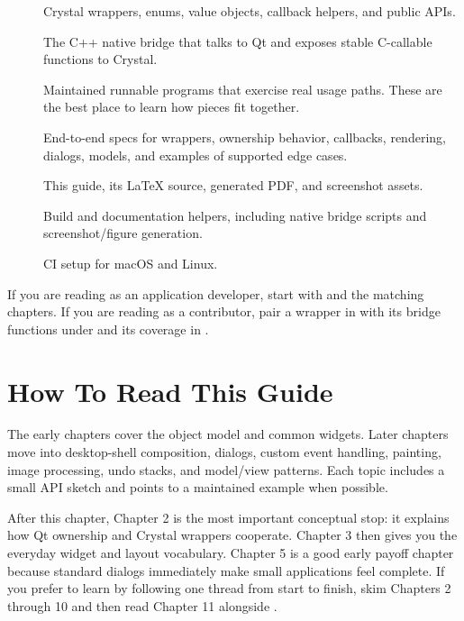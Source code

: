\begin{description}
\item[] Crystal wrappers, enums, value objects, callback helpers, and public APIs.
\item[] The C++ native bridge that talks to Qt and exposes stable C-callable functions to Crystal.
\item[] Maintained runnable programs that exercise real usage paths. These are the best place to learn how pieces fit together.
\item[] End-to-end specs for wrappers, ownership behavior, callbacks, rendering, dialogs, models, and examples of supported edge cases.
\item[] This guide, its LaTeX source, generated PDF, and screenshot assets.
\item[] Build and documentation helpers, including native bridge scripts and screenshot/figure generation.
\item[] CI setup for macOS and Linux.
\end{description}

If you are reading as an application developer, start with  and the matching chapters. If you are reading as a contributor, pair a wrapper in  with its bridge functions under  and its coverage in .

\section{How To Read This Guide}

The early chapters cover the object model and common widgets. Later chapters move into desktop-shell composition, dialogs, custom event handling, painting, image processing, undo stacks, and model/view patterns. Each topic includes a small API sketch and points to a maintained example when possible.

After this chapter, Chapter 2 is the most important conceptual stop: it explains how Qt ownership and Crystal wrappers cooperate. Chapter 3 then gives you the everyday widget and layout vocabulary. Chapter 5 is a good early payoff chapter because standard dialogs immediately make small applications feel complete. If you prefer to learn by following one thread from start to finish, skim Chapters 2 through 10 and then read Chapter 11 alongside .

